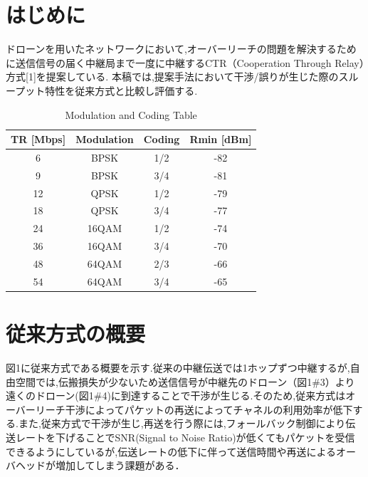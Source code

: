 \documentclass[a4paper,10pt]{ltjsarticle}
\begin{document}
\fontsize{10.5pt}{14pt}\selectfont

\tableofcontents
\thispagestyle{empty}
\clearpage

\setcounter{page}{1}
\section{はじめに}
ドローンを用いたネットワークにおいて,オーバーリーチの問題を解決するために送信信号の届く中継局まで一度に中継するCTR（Cooperation Through Relay）方式[1]を提案している. 本稿では,提案手法において干渉/誤りが生じた際のスループット特性を従来方式と比較し評価する.


\begingroup
\renewcommand{\rmdefault}{ptm} %
\begin{table}[h]
  \caption{Modulation and Coding Table}
  \centering
  \renewcommand{\arraystretch}{1.2}
  \begin{tabular}{c c c c}
    \toprule
    TR [Mbps] & Modulation & Coding & Rmin [dBm] \\ 
    \midrule
    6  & BPSK  & 1/2  & -82 \\
    9  & BPSK  & 3/4  & -81 \\
    12 & QPSK  & 1/2  & -79 \\
    18 & QPSK  & 3/4  & -77 \\
    24 & 16QAM & 1/2  & -74 \\
    36 & 16QAM & 3/4  & -70 \\
    48 & 64QAM & 2/3  & -66 \\
    54 & 64QAM & 3/4  & -65 \\
    \bottomrule
  \end{tabular}
  
  \label{tab:modulation_coding}
\end{table}
\endgroup



\section{従来方式の概要}
図1に従来方式である概要を示す.従来の中継伝送では1ホップずつ中継するが,自由空間では,伝搬損失が少ないため送信信号が中継先のドローン（図1\#3）より遠くのドローン(図1\#4)に到達することで干渉が生じる.そのため,従来方式はオーバーリーチ干渉によってパケットの再送によってチャネルの利用効率が低下する.また,従来方式で干渉が生じ,再送を行う際には,フォールバック制御により伝送レートを下げることでSNR(Signal to Noise Ratio)が低くてもパケットを受信できるようにしているが,伝送レートの低下に伴って送信時間や再送によるオーバヘッドが増加してしまう課題がある．
\end{document}
